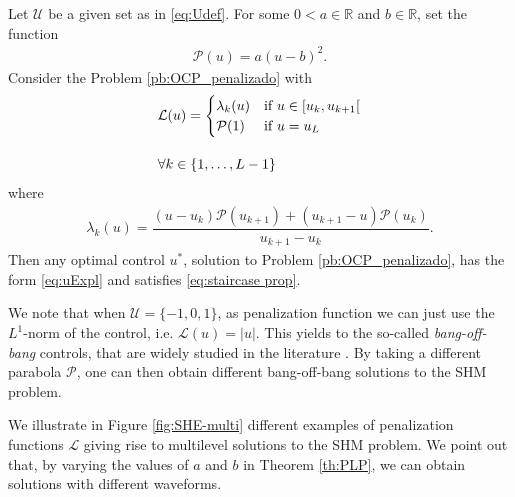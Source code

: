 \documentclass[twocolumn]{autart}    %
\begin{document}
\vspace{1em}
\begin{theorem}\label{th:PLP}
Let $\mathcal{U}$ be a given set as in \eqref{eq:Udef}.
For some $0<a\in\mathbb{R}$ and $b\in \mathbb{R}$, set the function
\begin{align*}
	\mathcal{P}(u) = a (u-b)^2.
\end{align*}
Consider the Problem \ref{pb:OCP_penalizado} with 
\begin{align}\label{eq:PLP}
	&\mathcal{L}(u) = \begin{cases}
            \lambda_k(u) & \text{if }  u \in [u_k,u_{k+1}[ \\ \mathcal{P}(1) & \text{if } u = u_{L} 
    \end{cases} 
	\\[10pt]
	&\notag \forall k \in \{1,\dots,L-1\} 
\end{align}
where 
\begin{align}\label{eq:lambda k}
	\lambda_k(u) = \dfrac{ (u-u_k)\mathcal{P}(u_{k+1}) + (u_{k+1}- u) \mathcal{P}(u_k)}{u_{k+1} - u_k}.
\end{align}
Then any optimal control $u^\ast$, solution to Problem \ref{pb:OCP_penalizado}, has the form \eqref{eq:uExpl} and satisfies \eqref{eq:staircase prop}.
\end{theorem}

\bigskip

\begin{remark}
We note that when  $\mathcal{U}= \{-1,0,1\}$, as penalization function we can just use the $L^1$-norm of the control, i.e. $\mathcal{L}(u) = |u|$. This yields to the so-called \emph{bang-off-bang} controls, that are widely studied in the literature \cite{Wang2020}. By taking a different parabola $\mathcal{P}$, one can then obtain different bang-off-bang solutions to the SHM problem.
\end{remark}

We illustrate in Figure \ref{fig:SHE-multi} different examples of penalization functions $\mathcal{L}$ giving rise to multilevel solutions to the SHM problem. We point out that, by varying the values of $a$ and $b$ in Theorem \ref{th:PLP}, we can obtain solutions with different waveforms.

\bigskip
\end{document}
